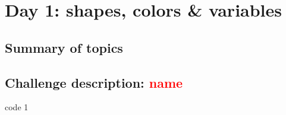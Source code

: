 \chapter{Day 1: shapes, colors \& variables}

\section{Summary of topics}

\section{Challenge description: \textcolor{red}{name}}

\begin{codebox}{code 1}
    
\end{codebox}
    

